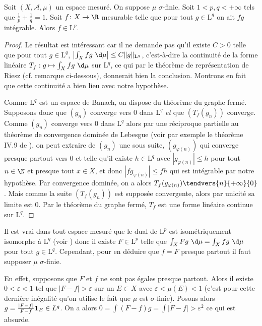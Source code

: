 \documentclass{notes}
\begin{document}
Soit $(X,\mathcal A,\mu)$ un espace mesuré. On suppose $\mu$ $\sigma$-finie.  Soit $1< p,q < +\infty$ tels que $\frac 1p + \frac 1q = 1$. Soit $f\colon X\to \R$ mesurable telle que pour tout $g\in \mathrm L^{q}$ on ait $fg$ intégrable. Alors $f\in \mathrm L^{p}$. 

\begin{proof}
  Le résultat est intéressant car il ne demande pas qu'il existe $C>0$ telle que pour tout $g\in \mathrm L^{q}$, $\left| \int_{X} fg \ \d \mu \right| \leq C\|g\|_{\mathrm L^{q}}$, c'est-à-dire la continuité de la forme linéaire $T_f : g\mapsto \int_X fg \ \d \mu$ sur $\mathrm L^{q}$, ce qui par le théorème de représentation de Riesz (cf. remarque ci-dessous), donnerait bien la conclusion. Montrons en fait que cette continuité a bien lieu avec notre hypothèse. 
  
  Comme $\mathrm L^{q}$ est un espace de Banach, on dispose du théorème du graphe fermé. Supposons donc que $(g_n)$ converge vers $0$ dans $\mathrm L^{q}$ \emph{et} que $(T_f(g_n))$ converge. Comme $(g_n)$ converge vers $0$ dans $\mathrm L^{q}$ alors par une réciproque partielle au théorème de convergence dominée de Lebesgue (voir par exemple le théorème IV.9 de \cite{Brezis}), on peut extraire de $(g_n)$ une sous suite, $(g_{\varphi(n)})$ qui converge presque partout vers $0$ et telle qu'il existe $h\in\mathrm L^{q}$ avec $|g_{\varphi(n)}|\leq h$ pour tout $n\in\N$ et presque tout $x\in X$, et donc $|fg_{\varphi(n)}|\leq fh$ qui est intégrable par notre hypothèse. Par convergence dominée, on a alors $T_f(g_{\varphi(n)}) \tendvers{n}{+\infty}{0}$. Mais comme la suite $(T_f(g_n))$ est supposée convergente, alors par unicité sa limite est $0$. Par le théorème du graphe fermé, $T_f$ est une forme linéaire continue sur $\mathrm L^{q}$.

\end{proof}


\begin{rem}
  Il est vrai dans tout espace mesuré que le dual de $\mathrm L^{p}$ est isométriquement isomorphe à $\mathrm L^{q}$ (voir \cite{Folland}) donc il existe $F\in\mathrm L^{p}$ telle que $\int_X Fg\ \d \mu = \int_X fg \ \d \mu$ pour tout $g\in\mathrm L^{q}$. Cependant, pour en déduire que $f=F$ presque partout il faut supposer $\mu$ $\sigma$-finie. 
  
  En effet,  supposons que $F$ et $f$ ne sont pas égales presque partout. Alors il existe $0<\varepsilon<1$ tel que $|F-f|>\varepsilon$ sur un $E\subset X$ avec $\varepsilon < \mu(E) < 1$ (c'est pour cette dernière inégalité qu'on utilise le fait que $\mu$ est $\sigma$-finie). Posons alors $g = \frac{\left| F-f \right|}{F-f} \mathbf 1_E \in \mathrm \mathrm L^{q}$. On a alors $0 = \int (F-f) g = \int |F-f| > \varepsilon^{2}$ ce qui est absurde.
\end{rem}


 
\end{document}
